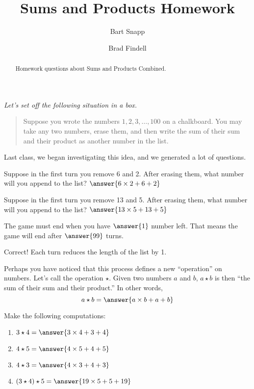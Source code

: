 \documentclass{ximera}
\title{Sums and Products Homework}
\author{Bart Snapp \and Brad Findell}
\begin{document}
\begin{abstract}
Homework questions about Sums and Products Combined. 
\end{abstract}
\maketitle

\emph{Let's set off the following situation in a box.} 
\begin{quote}
Suppose you wrote the numbers $1,2,3,\dots,100$ on a chalkboard. You
may take any two numbers, erase them, and then write the sum of their
sum and their product as another number in the list.
\end{quote}
Last class, we began investigating this idea, and we generated a lot
of questions.  

\begin{problem}
Suppose in the first turn you remove 6 and 2.  After erasing them, what number will you append to the list?  $\answer{6\times 2+6+2}$
\end{problem}

\begin{problem}
Suppose in the first turn you remove 13 and 5.  After erasing them, what number will you append to the list?  $\answer{13\times 5+13+5}$
\end{problem}

\begin{problem}
The game must end when you have $\answer{1}$ number left.  That means the game will end after $\answer{99}$ turns.
\begin{feedback}[correct]
Correct!  Each turn reduces the length of the list by 1.
\end{feedback}
\end{problem}

\begin{problem}
Perhaps you have noticed that this process defines a new ``operation'' on numbers.  Let's
call the operation $\star$.  Given two numbers $a$ and $b$, $a\star b$
is then ``the sum of their sum and their product.''  In other words, 
\[
a\star b = \answer{a\times b+a+b}
\]
\end{problem}

\begin{problem}
Make the following computations:
\begin{enumerate}
\item $3\star 4= \answer{3\times 4+3+4}$
\item $4\star 5= \answer{4\times 5+4+5}$
\item $4\star 3= \answer{4\times 3+4+3}$
\item $(3\star 4)\star 5 = \answer{19\times 5+5+19}$
\end{enumerate}
\end{problem}
\end{document}
